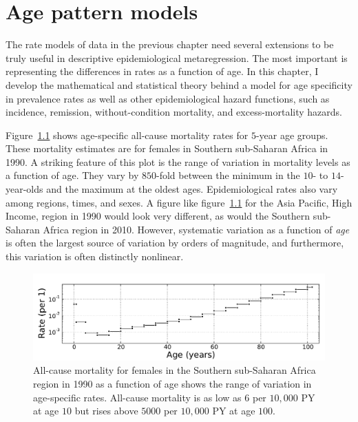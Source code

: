 \chapter{Age pattern models}
\label{theory-age_pattern_model}
The rate models of data in the previous chapter need several
extensions to be truly useful in descriptive epidemiological
metaregression.  The most important is representing the differences in
rates as a function of age.  In this chapter, I develop the
mathematical and statistical theory behind a model for age specificity
in prevalence rates as well as other epidemiological hazard functions,
such as incidence, remission, without-condition mortality, and
excess-mortality hazards.

Figure~\ref{ssas-mx_female_1990} shows age-specific all-cause
mortality rates for $5$-year age groups.  These mortality estimates are
for females in Southern sub-Saharan Africa in 1990.  A striking
feature of this plot is the range of variation in mortality levels as
a function of age.  They vary by $850$-fold between the minimum
in the $10$- to $14$-year-olds and the maximum at the oldest
ages. Epidemiological rates also vary among regions, times, and
sexes.  A figure like figure~\ref{ssas-mx_female_1990} for the Asia Pacific,
High Income, region in 1990 would look very different, as
would the Southern sub-Saharan Africa region in 2010. However,
systematic variation as a function of \emph{age} is often the largest
source of variation by orders of magnitude, and furthermore, this
variation is often distinctly nonlinear.

\begin{figure}[h]
\begin{center}
\includegraphics[width=\textwidth]{ssas-mx_female_1990.pdf}
\caption[All-cause mortality as a function of age.]{All-cause mortality for
  females in the Southern sub-Saharan Africa
  region in 1990 as a function of age shows the range of
  variation in age-specific rates.  All-cause mortality is as low as $6$ per
  $10,000$ PY at age $10$ but rises above $5000$ per $10,000$ PY at age $100$.}
\label{ssas-mx_female_1990}
\end{center}
\end{figure}

